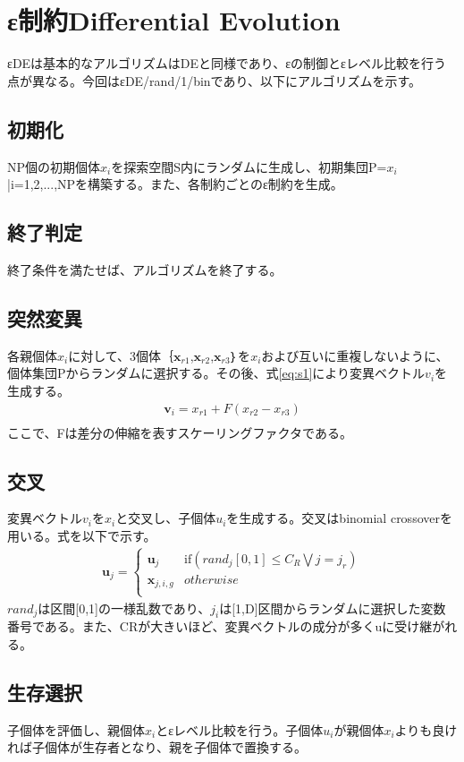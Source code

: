 \documentclass[twocolumn,10pt]{jarticle}
\begin{document}
\section{ε制約Differential Evolution}
εDEは基本的なアルゴリズムはDEと同様であり、εの制御とεレベル比較を行う点が異なる。今回はεDE/rand/1/binであり、以下にアルゴリズムを示す。
\subsection{初期化}
NP個の初期個体${x}_i$を探索空間S内にランダムに生成し、初期集団P={${x}_i$|i=1,2,...,NP}を構築する。また、各制約ごとのε制約を生成。
\subsection{終了判定}
終了条件を満たせば、アルゴリズムを終了する。
\subsection{突然変異}
各親個体${x}_i$に対して、3個体｛$\bm{x}_{r1}$,$\bm{x}_{r2}$,$\bm{x}_{r3}$｝を${x}_i$および互いに重複しないように、個体集団Pからランダムに選択する。その後、式\ref{eq:s1}により変異ベクトル${v}_i$を生成する。
\begin{eqnarray}
\bm{v}_i={x}_{r1}+F({x}_{r2}-{x}_{r3})\\
\label{eq:s1}
\end{eqnarray}
ここで、Fは差分の伸縮を表すスケーリングファクタである。
\subsection{交叉}
変異ベクトル${v}_i$を${x}_i$と交叉し、子個体${u}_i$を生成する。交叉はbinomial crossoverを用いる。式を以下で示す。
\begin{eqnarray}
\bm{u}_j=
\left\{
\begin{array}{cc}
    \bm{u}_j & \mbox{if$({rand}_j[0,1]\leq{C}_R \bigvee j={j}_r)$}\\
    \bm{x}_{j,i,g} & \mbox{$otherwise$}\\
\end{array}
\right.
\end{eqnarray}
${rand}_j$は区間[0,1]の一様乱数であり、${j}_i$は[1,D]区間からランダムに選択した変数番号である。また、CRが大きいほど、変異ベクトルの成分が多くuに受け継がれる。

\subsection{生存選択}
子個体を評価し、親個体${x}_i$とεレベル比較を行う。子個体${u}_i$が親個体${x}_i$よりも良ければ子個体が生存者となり、親を子個体で置換する。
\end{document}
